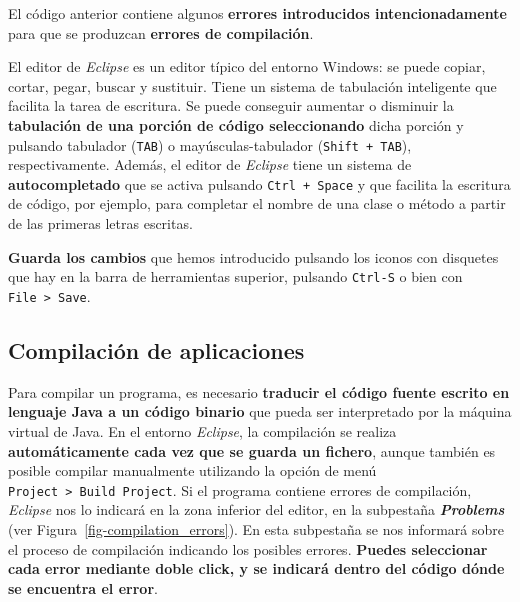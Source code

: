 \documentclass[
  spanish,
  11pt,
  a4paper,
  DIV=11,
  numbers=noendperiod]{scrartcl}
\begin{document}

\begin{tcolorbox}[enhanced jigsaw, toprule=.15mm, coltitle=black, titlerule=0mm, opacitybacktitle=0.6, breakable, colback=white, colframe=quarto-callout-warning-color-frame, colbacktitle=quarto-callout-warning-color!10!white, opacityback=0, title={Errores de compilación}, bottomtitle=1mm, rightrule=.15mm, toptitle=1mm, left=2mm, bottomrule=.15mm, leftrule=.75mm, arc=.35mm]

El código anterior contiene algunos \textbf{errores introducidos intencionadamente} para que se produzcan \textbf{errores de compilación}.

\end{tcolorbox}

El editor de \emph{Eclipse} es un editor típico del entorno Windows: se puede copiar, cortar, pegar, buscar y sustituir. Tiene un sistema de tabulación inteligente que facilita la tarea de escritura. Se puede conseguir aumentar o disminuir la \textbf{tabulación de una porción de código seleccionando} dicha porción y pulsando tabulador (\texttt{TAB}) o mayúsculas-tabulador (\texttt{Shift\ +\ TAB}), respectivamente. Además, el editor de \emph{Eclipse} tiene un sistema de \textbf{autocompletado} que se activa pulsando \texttt{Ctrl\ +\ Space} y que facilita la escritura de código, por ejemplo, para completar el nombre de una clase o método a partir de las primeras letras escritas.

\textbf{Guarda los cambios} que hemos introducido pulsando los iconos con disquetes que hay en la barra de herramientas superior, pulsando \texttt{Ctrl-S} o bien con \texttt{File\ \textgreater{}\ Save}.

\subsection{Compilación de aplicaciones}\label{compilaciuxf3n-de-aplicaciones}

Para compilar un programa, es necesario \textbf{traducir el código fuente escrito en lenguaje Java a un código binario} que pueda ser interpretado por la máquina virtual de Java. En el entorno \emph{Eclipse}, la compilación se realiza \textbf{automáticamente cada vez que se guarda un fichero}, aunque también es posible compilar manualmente utilizando la opción de menú \texttt{Project\ \textgreater{}\ Build\ Project}. Si el programa contiene errores de compilación, \emph{Eclipse} nos lo indicará en la zona inferior del editor, en la subpestaña \textbf{\emph{Problems}} (ver Figura~\ref{fig-compilation_errors}). En esta subpestaña se nos informará sobre el proceso de compilación indicando los posibles errores. \textbf{Puedes seleccionar cada error mediante doble click, y se indicará dentro del código dónde se encuentra el error}.
\end{document}
